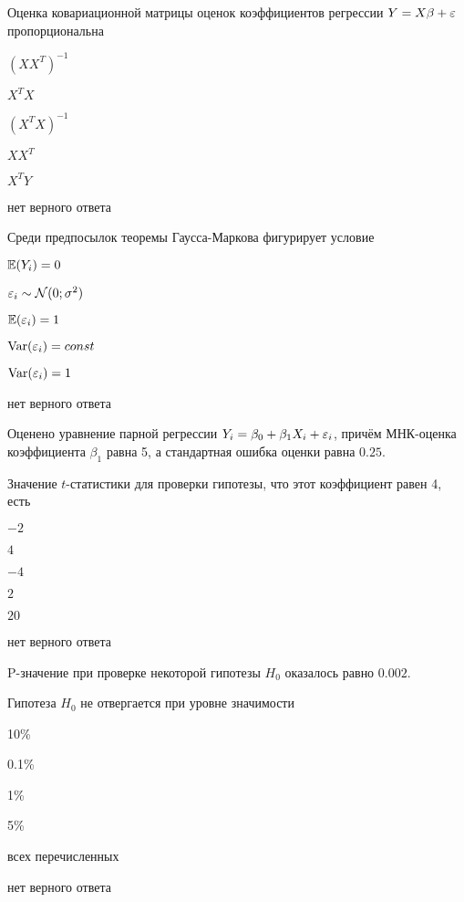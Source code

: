\begin{question}
Оценка ковариационной матрицы оценок коэффициентов регрессии $Y=X\beta + \varepsilon$ пропорциональна
\begin{answerlist}
  \item $(XX^T)^{-1}$
  \item $X^TX$
  \item $(X^TX)^{-1}$
  \item $XX^T$
  \item $X^TY$
  \item нет верного ответа
\end{answerlist}
\end{question}

\begin{question}
Среди предпосылок теоремы Гаусса-Маркова фигурирует условие
\begin{answerlist}
  \item $\operatorname{\mathbb{E}}(Y_i)=0$
  \item $\varepsilon_i \sim \mathcal{N}(0;\sigma^2)$
  \item $\operatorname{\mathbb{E}}(\varepsilon_i)=1$
  \item $\operatorname{Var}(\varepsilon_i)=const$
  \item $\operatorname{Var}(\varepsilon_i)=1$
  \item нет верного ответа
\end{answerlist}
\end{question}


\begin{question}
Оценено уравнение парной регрессии $Y_i = \beta_0 + \beta_1 X_i + \varepsilon_i$, причём МНК-оценка
коэффициента $\beta_1$ равна 5, а стандартная ошибка оценки равна $0.25$.

Значение $t$-статистики для проверки гипотезы, что этот коэффициент равен 4, есть
\begin{answerlist}
  \item $-2$
  \item $4$
  \item $-4$
  \item $2$
  \item $20$
  \item нет верного ответа
\end{answerlist}
\end{question}

\begin{question}
P-значение при проверке некоторой гипотезы $H_0$ оказалось равно $0.002$.

Гипотеза $H_0$ не отвергается при уровне значимости
\begin{answerlist}
    \item 10\%
    \item 0.1\%  
    \item 1\%
  \item 5\%
  \item всех перечисленных
  \item нет верного ответа
\end{answerlist}
\end{question}


